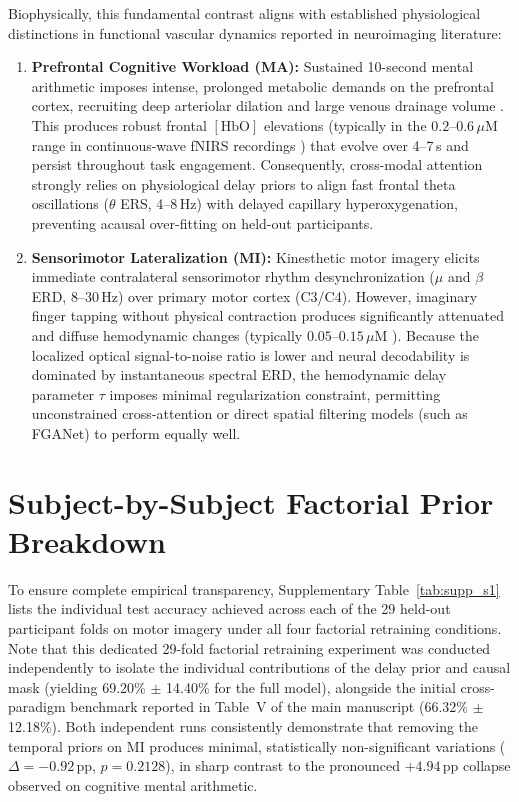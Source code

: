 \documentclass[journal]{IEEEtran}
\begin{document}
Biophysically, this fundamental contrast aligns with established physiological distinctions in functional vascular dynamics reported in neuroimaging literature:
\begin{enumerate}
    \item \textbf{Prefrontal Cognitive Workload (MA):} Sustained 10-second mental arithmetic imposes intense, prolonged metabolic demands on the prefrontal cortex, recruiting deep arteriolar dilation and large venous drainage volume \cite{buxton1998dynamics, scholkmann2014review}. This produces robust frontal $[\mathrm{HbO}]$ elevations (typically in the $0.2\text{--}0.6\,\mu\mathrm{M}$ range in continuous-wave fNIRS recordings \cite{shin2017open}) that evolve over 4--7\,s and persist throughout task engagement. Consequently, cross-modal attention strongly relies on physiological delay priors to align fast frontal theta oscillations ($\theta$ ERS, 4--8\,Hz) with delayed capillary hyperoxygenation, preventing acausal over-fitting on held-out participants.
    \item \textbf{Sensorimotor Lateralization (MI):} Kinesthetic motor imagery elicits immediate contralateral sensorimotor rhythm desynchronization ($\mu$ and $\beta$ ERD, 8--30\,Hz) over primary motor cortex (C3/C4). However, imaginary finger tapping without physical contraction produces significantly attenuated and diffuse hemodynamic changes (typically $0.05\text{--}0.15\,\mu\mathrm{M}$ \cite{shin2017open, pinti2020present}). Because the localized optical signal-to-noise ratio is lower and neural decodability is dominated by instantaneous spectral ERD, the hemodynamic delay parameter $\tau$ imposes minimal regularization constraint, permitting unconstrained cross-attention or direct spatial filtering models (such as FGANet) to perform equally well.
\end{enumerate}

\section{Subject-by-Subject Factorial Prior Breakdown}
\label{sec:supp_breakdown}

To ensure complete empirical transparency, Supplementary Table~\ref{tab:supp_s1} lists the individual test accuracy achieved across each of the 29 held-out participant folds on motor imagery under all four factorial retraining conditions. Note that this dedicated 29-fold factorial retraining experiment was conducted independently to isolate the individual contributions of the delay prior and causal mask (yielding 69.20\% $\pm$ 14.40\% for the full model), alongside the initial cross-paradigm benchmark reported in Table~V of the main manuscript (66.32\% $\pm$ 12.18\%). Both independent runs consistently demonstrate that removing the temporal priors on MI produces minimal, statistically non-significant variations ($\Delta = -0.92$\,pp, $p = 0.2128$), in sharp contrast to the pronounced $+4.94$\,pp collapse observed on cognitive mental arithmetic.
\end{document}
